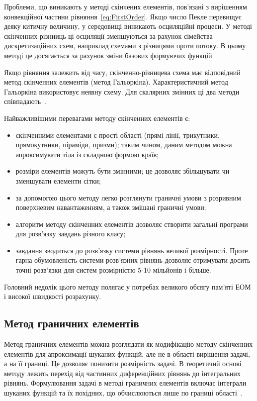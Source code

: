 \documentclass{diploma}
\begin{document}
Проблеми, що виникають у методі скінченнх елементів, пов'язані з вирішенням конвекційної частини рівняння~\ref{eq:FirstOrder}. Якщо число Пекле перевищує деяку китичну величину, у середовищі виникають осциляційні процеси. У методі скінченних різнииць ці осциляції зменшуються за рахунок сімейства дискретизаційних схем, наприклад схемами з різницями проти потоку. В цьому методі це досягається за рахунок зміни базових формуючих функцій.

Якщо рівняння залежить від часу, скінченно-різницева схема має відповідний метод скінченних елементів (метод Гальоркіна). Характеристичний метод Гальоркіна використовує неявну схему. Для скалярних змінних ці два методи співпадають~\cite{Lewis}.

Найважливішими перевагами методу скінченних елементів є:
\begin{itemize}
	\item скінченними елементами є прості області (прямі лінії, трикутники, прямокутники, піраміди, призми); таким чином, даним методом можна апроксимувати тіла із складною формою країв;
	\item розміри елементів можуть бути змінними; це дозволяє збільшувати чи зменшувати елементи сітки;
	\item за допомогою цього методу легко розглянути граничні умови з розривним поверхневим навантаженням, а також змішані граничні умови;
	\item алгоритм методу скінченних елементів дозволяє створити загальні програми для розв'язку завдань різного класу;
	\item завдання зводиться до розв'язку системи рівнянь великої розмірності. Проте гарна обумовленість системи розв'язних рівнянь  дозволяє отримувати досить точні розв'язки для систем розмірністю 5-10 мільйонів і більше.
\end{itemize}

Головний недолік цього методу полягає у потребах великого обсягу пам'яті ЕОМ і високої швидкості розрахунку.

\subsection{Метод граничних елементів}
Метод граничних елементів можна розглядати як модифікацію методу скінченних елементів для апроксимації шуканих функцій, але не в області вирішення задачі, а на її границі. Це дозволяє понизити розмірність задачі. В теоретичнй основі методу лежить перехід від частинних диференційних рівнянь до інтегральних рівнянь. Формулювання задачі в методі граничних елементів включає інтеграли шуканих функцій та їх похідних, що обчислюються лише по границі області~\cite{Vlasova}.
\end{document}
